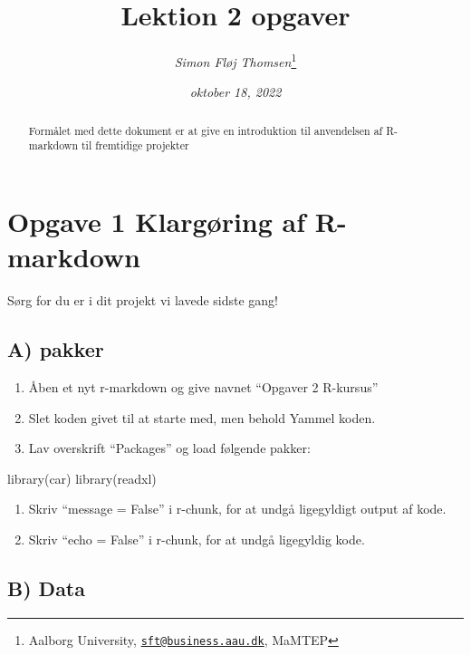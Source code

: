 \documentclass[
  12pt,
]{article}
\title{Lektion 2 opgaver}
\author{\emph{Simon Fløj Thomsen}\footnote{Aalborg University,
  \href{mailto:sft@business.aau.dk}{\nolinkurl{sft@business.aau.dk}},
  MaMTEP}}
\date{\emph{oktober 18, 2022}}
\newenvironment{Shaded}{\begin{snugshade}}{\end{snugshade}}
\newcommand{\FunctionTok}[1]{\textcolor[rgb]{0.00,0.00,0.00}{#1}}
\newcommand{\NormalTok}[1]{#1}
\providecommand{\tightlist}{%
  \setlength{\itemsep}{0pt}\setlength{\parskip}{0pt}}
\begin{document}
\maketitle
\begin{abstract}
\begingroup Formålet med dette dokument er at give en introduktion til
anvendelsen af R-markdown til fremtidige projekter \endgroup
\end{abstract}

\hypertarget{opgave-1-klarguxf8ring-af-r-markdown}{%
\section{Opgave 1 Klargøring af
R-markdown}\label{opgave-1-klarguxf8ring-af-r-markdown}}

Sørg for du er i dit projekt vi lavede sidste gang!

\hypertarget{a-pakker}{%
\subsection{A) pakker}\label{a-pakker}}

\begin{enumerate}
\def\labelenumi{\arabic{enumi}.}
\tightlist
\item
  Åben et nyt r-markdown og give navnet ``Opgaver 2 R-kursus''
\item
  Slet koden givet til at starte med, men behold Yammel koden.
\item
  Lav overskrift ``Packages'' og load følgende pakker:
\end{enumerate}

\begin{Shaded}
\begin{Highlighting}[]
\FunctionTok{library}\NormalTok{(car)}
\FunctionTok{library}\NormalTok{(readxl)}
\end{Highlighting}
\end{Shaded}

\begin{enumerate}
\def\labelenumi{\arabic{enumi}.}
\setcounter{enumi}{3}
\tightlist
\item
  Skriv ``message = False'' i r-chunk, for at undgå ligegyldigt output
  af kode.
\item
  Skriv ``echo = False'' i r-chunk, for at undgå ligegyldig kode.
\end{enumerate}

\hypertarget{b-data}{%
\subsection{B) Data}\label{b-data}}
\end{document}
